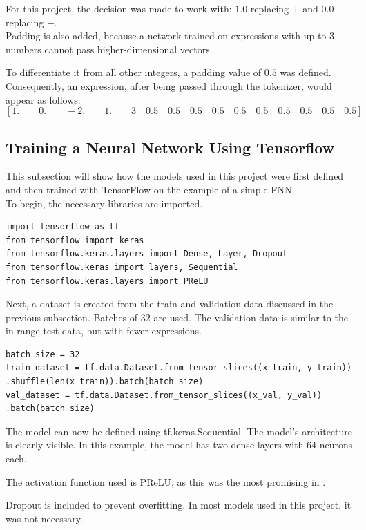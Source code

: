 \documentclass{article}
\begin{document}
For this project, the decision was made to work with: $1.0$ replacing $+$ and $0.0$ replacing $-$.
\\[2em]

Padding is also added, because a network trained on expressions with up to 3 numbers cannot pass higher-dimensional vectors.

To differentiate it from all other integers, a padding value of $0.5$ was defined.
\\[2em]
Consequently, an expression, after being passed through the tokenizer, would appear as follows:
$$
[1.\qquad 0.\qquad -2.\qquad 1.\qquad 3\quad 0.5\quad 0.5\quad 0.5\quad 0.5\quad 0.5\quad 0.5\quad 0.5\quad 0.5\quad 0.5\quad 0.5]
$$
\subsection{Training a Neural Network Using Tensorflow}
This subsection will show how the models used in this project were first defined and then trained with TensorFlow on the example of a simple FNN.
\\[2em]
To begin, the necessary libraries are imported.
\begin{Verbatim}
import tensorflow as tf
from tensorflow import keras
from tensorflow.keras.layers import Dense, Layer, Dropout
from tensorflow.keras import layers, Sequential
from tensorflow.keras.layers import PReLU
\end{Verbatim}

Next, a dataset is created from the train and validation data discussed in the previous subsection. Batches of 32 are used. The validation data is similar to the in-range test data, but with fewer expressions.
\begin{Verbatim}
batch_size = 32
train_dataset = tf.data.Dataset.from_tensor_slices((x_train, y_train))
.shuffle(len(x_train)).batch(batch_size)
val_dataset = tf.data.Dataset.from_tensor_slices((x_val, y_val))
.batch(batch_size)
\end{Verbatim}

The model can now be defined using tf.keras.Sequential. The model's architecture is clearly visible. In this example, the model has two dense layers with 64 neurons each.

The activation function used is PReLU, as this was the most promising in \cite{trask2018neuralarithmeticlogicunits}.

Dropout is included to prevent overfitting. In most models used in this project, it was not necessary.
\end{document}
